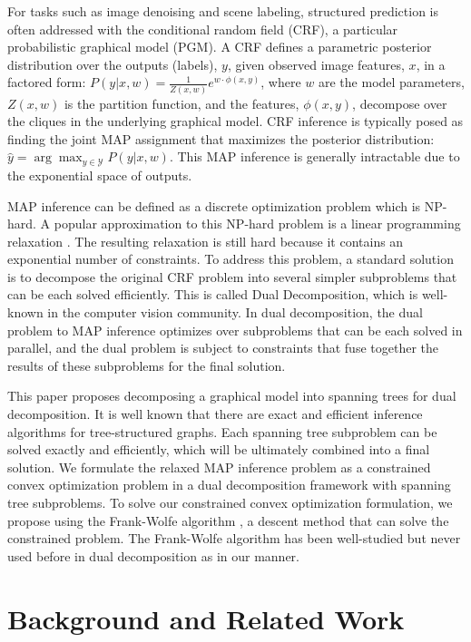 \documentclass[conference]{IEEEtran}
\begin{document}
For tasks such as image denoising and scene labeling, structured prediction is often addressed with the conditional random field (CRF), a particular probabilistic graphical model (PGM). A CRF defines a parametric posterior distribution over the outputs (labels), $y$, given observed image features, $x$, in a factored form: $P(y|x,w)= \frac{1}{Z(x,w)} e^{w \cdot \phi(x,y)}$, where $w$ are the model parameters, $Z(x,w)$ is the partition function, and the features, $\phi(x,y)$, decompose over the cliques in the underlying graphical model. CRF inference is typically posed as finding the joint MAP assignment that maximizes the posterior distribution: $\hat{y} = \arg\max_{y \in \mathcal{Y}} P(y|x,w)$. This MAP inference is generally intractable due to the exponential space of outputs.

MAP inference can be defined as a discrete optimization problem which is NP-hard. A popular approximation to this NP-hard problem is a linear programming relaxation \cite{Yanover06}. The resulting relaxation is still hard because it contains an exponential number of constraints. To address this problem, a standard solution is to decompose the original CRF problem into several simpler subproblems that can be each solved efficiently. This is called Dual Decomposition, which is well-known in the computer vision community. In dual decomposition, the dual problem to MAP inference optimizes over subproblems that can be each solved in parallel, and the dual problem is subject to constraints that fuse together the results of these subproblems for the final solution.

This paper proposes decomposing a graphical model into spanning trees for dual decomposition. It is well known that there are exact and efficient inference algorithms for tree-structured graphs. Each spanning tree subproblem can be solved exactly and efficiently, which will be ultimately combined into a final solution. We formulate the relaxed MAP inference problem as a constrained convex optimization problem in a dual decomposition framework with spanning tree subproblems. To solve our constrained convex optimization formulation, we propose using the Frank-Wolfe algorithm \cite{JaggiICML13}, a descent method that can solve the constrained problem. The Frank-Wolfe algorithm has been well-studied but never used before in dual decomposition as in our manner.

\section{Background and Related Work}
\end{document}
